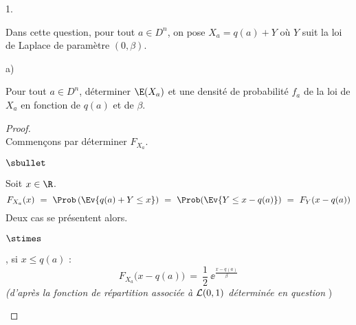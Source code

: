 \begin{noliste}{1.}
  \setlength{\itemsep}{4mm} %
  \setcounter{enumi}{13}
\item Dans cette question, pour tout $a\in D^n$, on pose $X_a = q(a) +
  Y$ où $Y$ suit la loi de Laplace de paramètre $(0, \beta)$.
  \begin{noliste}{a)}
    \setlength{\itemsep}{2mm} %
  \item Pour tout $a\in D^n$, déterminer $\E(X_a)$ et une densité de
    probabilité $f_a$ de la loi de $X_a$ en fonction de $q(a)$ et de
    $\beta$.
    
    \begin{proof}~\\%
      Commençons par déterminer $F_{X_a}$.
      \begin{noliste}{$\sbullet$}
      \item Soit $x \in \R$. 
        \[
        F_{X_a}(x) \ = \ \Prob\left(\Ev{q(a) + Y \leq x} \right) \ = \
        \Prob(\Ev{Y \leq x - q(a)}) \ = \ F_Y(x - q(a))
        \]
        Deux cas se présentent alors.
        \begin{noliste}{$\stimes$}
        \item {}, \ie si $x \leq q(a)$ :
          \[
          F_{X_a}\big(x - q(a) \big) \ = \ \dfrac{1}{2} \ \ee^{\frac{x -
              q(a)}{\beta}}
          \]
          {\it (d'après la fonction de répartition associée à ${\cal
              L}(0, 1)$ déterminée en question \itbf{3.b)}})
          
          
          \newpage
          

\end{noliste}
\end{noliste}
\end{proof}
\end{noliste}
\end{noliste}

